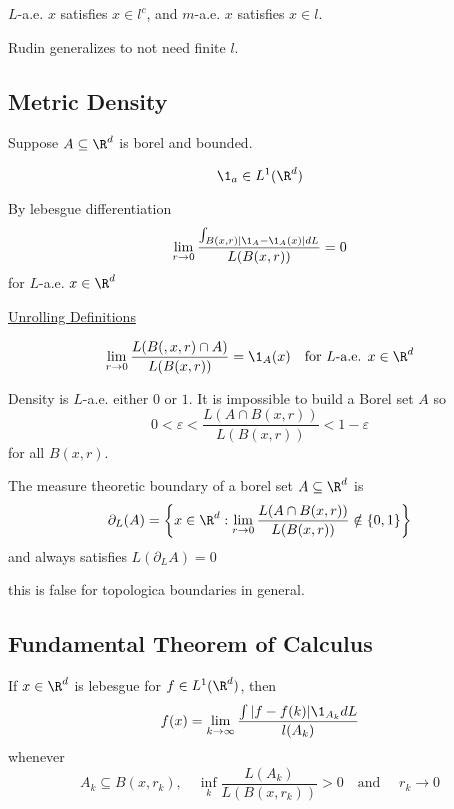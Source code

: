 \begin{remark}
	$L$-a.e. $x$ satisfies $x \in l^c$, and $m$-a.e. $x$ satisfies $x \in l.$
\end{remark}

Rudin generalizes to not need finite $l$.

\subsection{Metric Density}

Suppose $A \subseteq \R^d$ is borel and bounded.

\begin{remark}
	 \[
		\1_a \in L^1 (\R^d)
	\] 
\end{remark}

By lebesgue differentiation
\begin{align*}
	\lim_{r \to 0} \frac{\int_{B(x,r) |\1_A - \1_A(x)| dL}}{L(B(x,r))} = 0
\end{align*} for $L$-a.e. $x \in \R^d$

\underline{Unrolling Definitions}

\[
	\lim_{r \to 0}  \frac{L(B(,x,r) \cap A)}{L(B(x,r))} = \1_{A} (x) 
	\quad \text{for } L \text{-a.e. } x \in \R^d
\] 

Density is $L$-a.e. either $0$ or $1$. It is impossible to build a Borel set $A$ so
\[
	0 < \varepsilon < \frac{L(A \cap B(x,r))}{L(B(x,r))} < 1 - \varepsilon
\] 
for all $B(x,r)$.

\begin{remark}
	The measure theoretic boundary of a borel set $A \subseteq \R^d$ is
	\[
\partial_{L}(A) = \left\{x \in \R^d : \lim_{r \to 0}  \frac{L(A \cap B(x,r))}{L(B(x,r))} \notin \{0,1\} \right\}
	\] 
	and always satisfies $L(\partial_{L} A) = 0$
\end{remark}


\begin{remark}
	this is false for topologica boundaries in general.
\end{remark}



\subsection{Fundamental Theorem of Calculus}

\begin{lemma}
	If $x \in \R^d$ is lebesgue for $f \in L^1 (\R^d)$, then
	\[
		f(x) = \lim_{k \to \infty}  \frac{\int | f - f(k) |\1_{A_k} dL}{l(A_{k})}
	\] whenever 
	\[
		A_k \subseteq B(x,r_{k}), \quad \inf_{k} \frac{L(A_k)}{L(B(x,r_k))} > 0 \quad \text{and }\quad r_k \to 0
	\]
\end{lemma}

